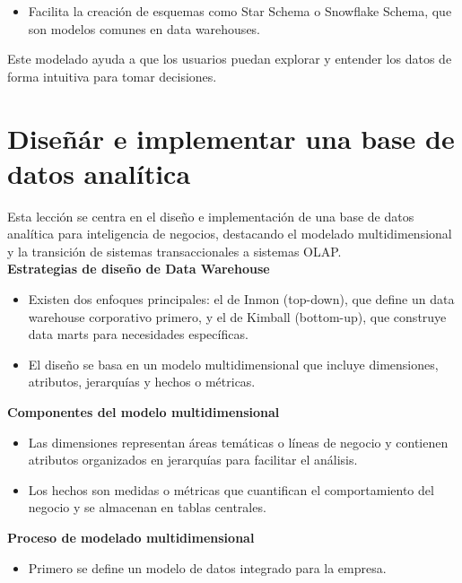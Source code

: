 \documentclass[11pt,letterpaper]{article}
\newcommand{\textoderecho}{Module 1 - Introduction to Business Intelligence as an Analytical System}
\newcommand{\encabezadoder}[1]{\renewcommand{\textoderecho}{#1}}
\begin{document}
\begin{itemize}
	\item Facilita la creación de esquemas como Star Schema o Snowflake Schema,
que son modelos comunes en data warehouses.
\end{itemize}
Este modelado ayuda a que los usuarios puedan explorar y entender los datos de
forma intuitiva para tomar decisiones. 
\newpage
\encabezadoder{Module 2 - Design of a Data Warehouse}
\section{Diseñár e implementar una base de datos analítica}
Esta lección se centra en el diseño e implementación de una base de datos analítica 
para inteligencia de negocios, destacando el modelado multidimensional y la transición 
de sistemas transaccionales a sistemas OLAP. \\

\textbf{Estrategias de diseño de Data Warehouse}
	\begin{itemize}
		\item Existen dos enfoques principales: el de Inmon (top-down), que define un data warehouse corporativo primero, y el de Kimball (bottom-up), que construye data marts para necesidades específicas. 
	\end{itemize}
    
	\begin{itemize}
		\item El diseño se basa en un modelo multidimensional que incluye dimensiones, atributos, jerarquías y hechos o métricas.
	\end{itemize} 
    

\textbf{Componentes del modelo multidimensional}
	\begin{itemize}
		\item Las dimensiones representan áreas temáticas o líneas de negocio y contienen atributos organizados en jerarquías para facilitar el análisis. 
	\end{itemize}

	\begin{itemize}
		\item Los hechos son medidas o métricas que cuantifican el comportamiento del negocio y se almacenan en tablas centrales.
	\end{itemize}
    
    

\textbf{Proceso de modelado multidimensional}
	\begin{itemize}
		\item Primero se define un modelo de datos integrado para la empresa.
	\end{itemize}
    
\end{document}
